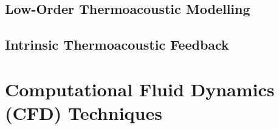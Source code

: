         


\subsection{Low-Order Thermoacoustic Modelling}



\subsection{Intrinsic Thermoacoustic Feedback}





\section{Computational Fluid Dynamics (CFD) Techniques}


\cite{orszag1970AnalyticalTheoriesTurbulence, domingo2023RecentDevelopmentsDNS, chen2011PetascaleDirectNumerical, yang2015LargeeddySimulationPresent, veynante2002TurbulentCombustionModeling, moin1998DirectNumericalSimulation, tennekes1972FirstCourseTurbulence}



